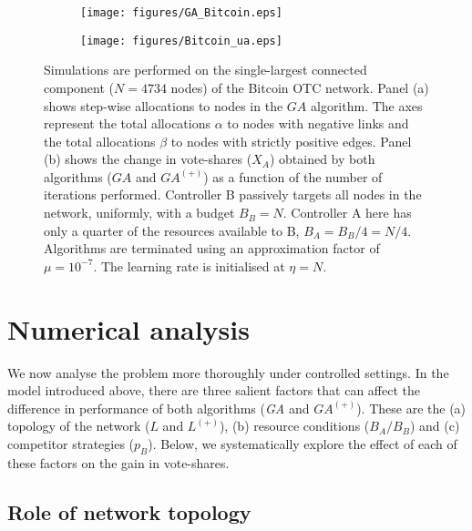 \begin{figure}
  \begin{subfigure}[b]{0.475\textwidth}
  \centering
    \texttt{[image: figures/GA\_Bitcoin.eps]}
    \caption{}
    \label{Fig-1a}
  \end{subfigure}
   \hspace{1em}
  \begin{subfigure}[b]{0.475\textwidth}
  \centering
    \texttt{[image: figures/Bitcoin\_ua.eps]}
    \caption{}
    \label{Fig-1b}
  \end{subfigure}
  \caption{Simulations are performed on the single-largest connected component ($N = 4734$ nodes) of the Bitcoin OTC network. Panel (a) shows step-wise allocations to nodes in the $GA$ algorithm. The axes represent the total allocations $\alpha$ to nodes with negative links and the total allocations $\beta$ to nodes with strictly positive edges.   Panel (b) shows the change in vote-shares ($X_{A}$) 
  obtained by both algorithms ($GA$ and $GA^{(+)}$) as a function of the number of iterations performed. Controller B passively targets all nodes in the network, uniformly, with a budget $B_{B} = N$. Controller A here has only a quarter of the resources available to B, $B_{A} = B_{B}/4 = N/4$. Algorithms are terminated using an approximation factor of $\mu = 10^{-7}$. The learning rate is initialised at $\eta=N$.}
  \label{Fig-1}
\end{figure}



\section{Numerical analysis}
\label{numerical}
We now analyse the problem more thoroughly under controlled settings.
In the model introduced above, there are three salient factors that can affect the difference in performance of both algorithms (\emph{GA} and ${GA^{(+)}}$). These are the (a) topology of the network ($L$ and $L^{(+)}$), (b) resource conditions ($B_{A}/B_{B}$) and (c) competitor strategies ($p_{B}$). Below, we systematically explore the effect of each of these factors on the gain in vote-shares.  

\subsection{Role of network topology}
\label{hetero}

